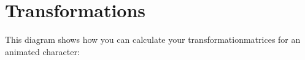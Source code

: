 \hypertarget{_animation_overview_Transformations}{}\section{Transformations}\label{_animation_overview_Transformations}
This diagram shows how you can calculate your transformationmatrices for an animated character\+:  